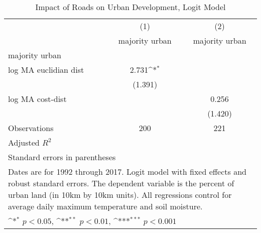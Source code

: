 \begin{table}[htbp]\centering
\def\sym#1{\ifmmode^{#1}\else\(^{#1}\)\fi}
\caption{Impact of Roads on Urban Development, Logit Model}
\begin{tabular}{l*{2}{c}}
\hline\hline
                    &\multicolumn{1}{c}{(1)}&\multicolumn{1}{c}{(2)}\\
                    &\multicolumn{1}{c}{majority urban}&\multicolumn{1}{c}{majority urban}\\
\hline
majority urban      &                     &                     \\
log MA euclidian dist&       2.731\sym{*}  &                     \\
                    &     (1.391)         &                     \\
[1em]
log MA cost-dist    &                     &       0.256         \\
                    &                     &     (1.420)         \\
\hline
Observations        &         200         &         221         \\
Adjusted \(R^{2}\)  &                     &                     \\
\hline\hline
\multicolumn{3}{l}{\footnotesize Standard errors in parentheses}\\
\multicolumn{3}{l}{\footnotesize Dates are for 1992 through 2017. Logit model with fixed effects and robust standard errors. The dependent variable is the percent of urban land (in 10km by 10km units). All regressions control for average daily maximum temperature and soil moisture.}\\
\multicolumn{3}{l}{\footnotesize \sym{*} \(p<0.05\), \sym{**} \(p<0.01\), \sym{***} \(p<0.001\)}\\
\end{tabular}
\end{table}
